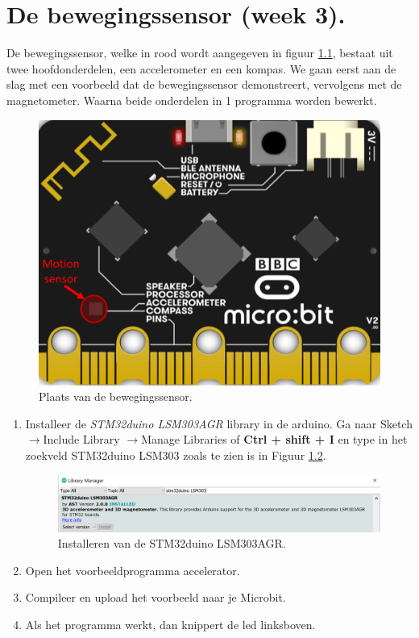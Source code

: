 \chapter{De bewegingssensor  \normalsize{(week 3).}}
\label{chap:bewSen}

De bewegingssensor, welke in rood wordt aangegeven in figuur \ref{fig:motion}, bestaat uit twee hoofdonderdelen, een accelerometer en een kompas. We gaan eerst aan de slag met een voorbeeld dat de bewegingssensor demonstreert, vervolgens met de magnetometer. Waarna beide onderdelen in 1 programma worden bewerkt.
\begin{figure}[h!]
	\captionsetup{justification=centering}
	\includegraphics[width=0.2 \linewidth]{figuren/motion}
	\centering
	\caption{Plaats van de bewegingssensor.}
	\label{fig:motion}
\end{figure}

\begin{enumerate}
\item Installeer de \textit{STM32duino LSM303AGR} library in de arduino. 
Ga naar Sketch $\rightarrow$Include Library $\rightarrow$Manage Libraries of \colorbox{mygray}{\textbf{Ctrl + shift + I}} en type in het zoekveld STM32duino LSM303 zoals te zien is in Figuur \ref{fig:stm32303}.
\begin{figure}[h!]
	\captionsetup{justification=centering}
	\includegraphics[width=0.6 \linewidth]{figuren/stm32duinoLib}
	\centering
	\caption{Installeren van de STM32duino LSM303AGR.}
	\label{fig:stm32303}
\end{figure}
\item Open het voorbeeldprogramma accelerator.
\item Compileer en upload het voorbeeld naar je Microbit.
\item Als het programma werkt, dan knippert de led linksboven. 
\end{enumerate}

